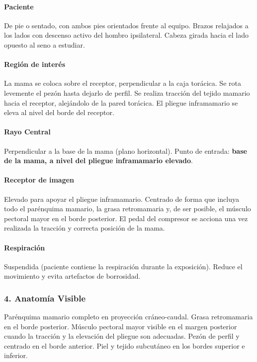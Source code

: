 	\paragraph{Paciente}
	De pie o sentado, con ambos pies orientados frente al equipo. Brazos relajados a los lados con descenso activo del hombro ipsilateral. Cabeza girada hacia el lado opuesto al seno a estudiar.
	
	\paragraph{Región de interés}
	La mama se coloca sobre el receptor, perpendicular a la caja torácica. Se rota levemente el pezón hasta dejarlo de perfil. Se realiza tracción del tejido mamario hacia el receptor, alejándolo de la pared torácica. El pliegue inframamario se eleva al nivel del borde del receptor.
	
	\paragraph{Rayo Central}
	Perpendicular a la base de la mama (plano horizontal). Punto de entrada: \textbf{base de la mama, a nivel del pliegue inframamario elevado}.
	
	\paragraph{Receptor de imagen}
	Elevado para apoyar el pliegue inframamario. Centrado de forma que incluya todo el parénquima mamario, la grasa retromamaria y, de ser posible, el músculo pectoral mayor en el borde posterior. El pedal del compresor se acciona una vez realizada la tracción y correcta posición de la mama.
	
	\paragraph{Respiración}
	Suspendida (paciente contiene la respiración durante la exposición). Reduce el movimiento y evita artefactos de borrosidad.
	
	\subsubsection*{4. Anatomía Visible}
	
	Parénquima mamario completo en proyección cráneo-caudal. Grasa retromamaria en el borde posterior. Músculo pectoral mayor visible en el margen posterior cuando la tracción y la elevación del pliegue son adecuadas. Pezón de perfil y centrado en el borde anterior. Piel y tejido subcutáneo en los bordes superior e inferior.
	
